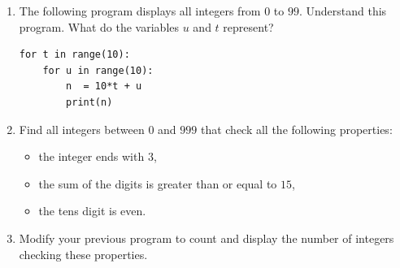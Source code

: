 \documentclass[11pt,class=report,crop=false]{standalone}
\begin{document}
\begin{activite}


\begin{enumerate}
  \item The following program displays all integers from $0$ to $99$. Understand this program. What do the variables $u$ and $t$ represent?
  
\begin{center}
\begin{minipage}{0.5\textwidth}
\begin{lstlisting}
for t in range(10):
    for u in range(10):
        n  = 10*t + u
        print(n)
\end{lstlisting}
\end{minipage} 
\end{center} 
  
  \item Find all integers between $0$ and $999$ that check all the following properties:
  \begin{itemize}
    \item the integer ends with $3$,
    
    \item the sum of the digits is greater than or equal to $15$,
    
    \item the tens digit is even.
  \end{itemize}
   
  
  \item Modify your previous program to count and display the number of integers checking these properties.
  
\end{enumerate}

\end{activite}



\end{document}
